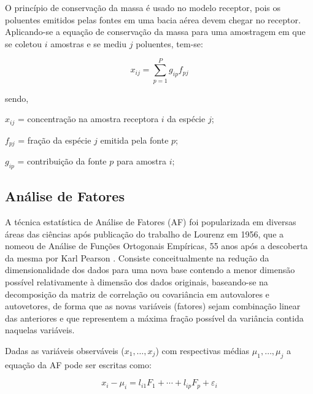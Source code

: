 O princípio de conservação da massa é usado no modelo receptor, pois os 
poluentes emitidos pelas fontes em uma bacia aérea devem chegar no 
receptor. Aplicando-se a equação de conservação da massa para uma amostragem 
em que se coletou $i$ amostras e se mediu $j$ poluentes, tem-se:

\begin{equation}
  \label{eq:conservacaomassa}
  x_{ij} = \sum_{p=1}^{P} g_{ip}f_{pj} %
\end{equation} 

sendo,
\begin{itemize}
  \begin{spacing}{1.0}
    \item $x_{ij}$ = concentração na amostra receptora $i$ da espécie $j$;
    \item $f_{pj}$ = fração da espécie $j$ emitida pela fonte $p$;
    \item $g_{ip}$ = contribuição da fonte $p$ para amostra $i$;
  \end{spacing}
\end{itemize}

\subsection{Análise de Fatores}

A técnica estatística de Análise de Fatores (AF) foi popularizada em diversas 
áreas das ciências após publicação do trabalho de Lourenz em 1956, que a nomeou
de Análise de Funções Ortogonais Empíricas, 55 anos após a 
descoberta da mesma por Karl Pearson \citep{bartholomew2011}. Consiste 
conceitualmente na redução da dimensionalidade dos dados para uma nova base 
contendo a menor dimensão possível relativamente à dimensão dos dados originais, 
baseando-se na decomposição da matriz de correlação ou covariância em 
autovalores e autovetores, de forma que as novas variáveis (fatores) sejam 
combinação linear das anteriores e que representem a máxima fração possível da 
variância contida naquelas variáveis.

Dadas as variáveis observáveis ($x_1,\dots,x_j$) com 
respectivas médias $\mu_1,\dots,\mu_j$ a equação da AF pode ser escritas como: 
 
\begin{equation}
  \label{eq:af}
  x_i-\mu_i = l_{i1} F_1 + \cdots + l_{ip} F_p + \varepsilon_i 
\end{equation}

